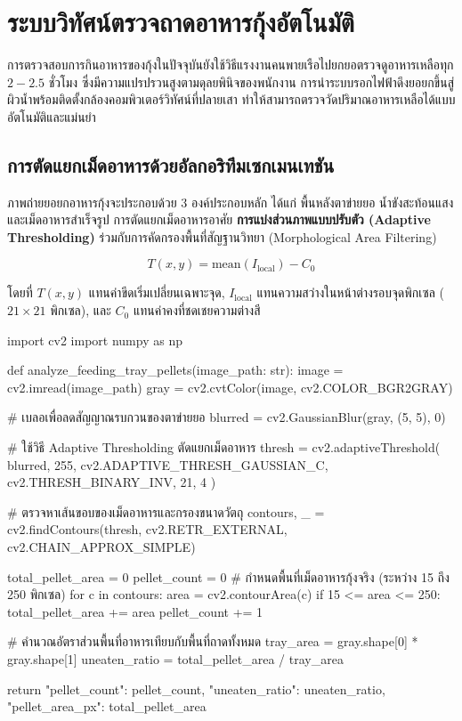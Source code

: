 \section{ระบบวิทัศน์ตรวจถาดอาหารกุ้งอัตโนมัติ}

การตรวจสอบการกินอาหารของกุ้งในปัจจุบันยังใช้วิธีแรงงานคนพายเรือไปยกยอตรวจดูอาหารเหลือทุก $2 - 2.5\text{ ชั่วโมง}$ ซึ่งมีความแปรปรวนสูงตามดุลยพินิจของพนักงาน การนำระบบรอกไฟฟ้าดึงยอยกขึ้นสู่ผิวน้ำพร้อมติดตั้งกล้องคอมพิวเตอร์วิทัศน์ที่ปลายเสา ทำให้สามารถตรวจวัดปริมาณอาหารเหลือได้แบบอัตโนมัติและแม่นยำ

\subsection{การตัดแยกเม็ดอาหารด้วยอัลกอริทึมเซกเมนเทชัน}

ภาพถ่ายยอยกอาหารกุ้งจะประกอบด้วย 3 องค์ประกอบหลัก ได้แก่ พื้นหลังตาข่ายยอ น้ำขังสะท้อนแสง และเม็ดอาหารสำเร็จรูป การตัดแยกเม็ดอาหารอาศัย \textbf{การแบ่งส่วนภาพแบบปรับตัว (Adaptive Thresholding)} ร่วมกับการคัดกรองพื้นที่สัญฐานวิทยา (Morphological Area Filtering)

\begin{equation}
T(x, y) = \text{mean}(I_{\text{local}}) - C_0
\label{eq:adaptive_thresh}
\end{equation}

โดยที่ $T(x, y)$ แทนค่าขีดเริ่มเปลี่ยนเฉพาะจุด, $I_{\text{local}}$ แทนความสว่างในหน้าต่างรอบจุดพิกเซล ($21 \times 21$ พิกเซล), และ $C_0$ แทนค่าคงที่ชดเชยความต่างสี

\begin{pythonbox}
import cv2
import numpy as np

def analyze_feeding_tray_pellets(image_path: str):
    image = cv2.imread(image_path)
    gray = cv2.cvtColor(image, cv2.COLOR_BGR2GRAY)
    
    # เบลอเพื่อลดสัญญาณรบกวนของตาข่ายยอ
    blurred = cv2.GaussianBlur(gray, (5, 5), 0)
    
    # ใช้วิธี Adaptive Thresholding ตัดแยกเม็ดอาหาร
    thresh = cv2.adaptiveThreshold(
        blurred, 255, cv2.ADAPTIVE_THRESH_GAUSSIAN_C,
        cv2.THRESH_BINARY_INV, 21, 4
    )
    
    # ตรวจหาเส้นขอบของเม็ดอาหารและกรองขนาดวัตถุ
    contours, _ = cv2.findContours(thresh, cv2.RETR_EXTERNAL, cv2.CHAIN_APPROX_SIMPLE)
    
    total_pellet_area = 0
    pellet_count = 0
    # กำหนดพื้นที่เม็ดอาหารกุ้งจริง (ระหว่าง 15 ถึง 250 พิกเซล)
    for c in contours:
        area = cv2.contourArea(c)
        if 15 <= area <= 250:
            total_pellet_area += area
            pellet_count += 1
            
    # คำนวณอัตราส่วนพื้นที่อาหารเทียบกับพื้นที่ถาดทั้งหมด
    tray_area = gray.shape[0] * gray.shape[1]
    uneaten_ratio = total_pellet_area / tray_area
    
    return {
        "pellet_count": pellet_count,
        "uneaten_ratio": uneaten_ratio,
        "pellet_area_px": total_pellet_area
    }
\end{pythonbox}

